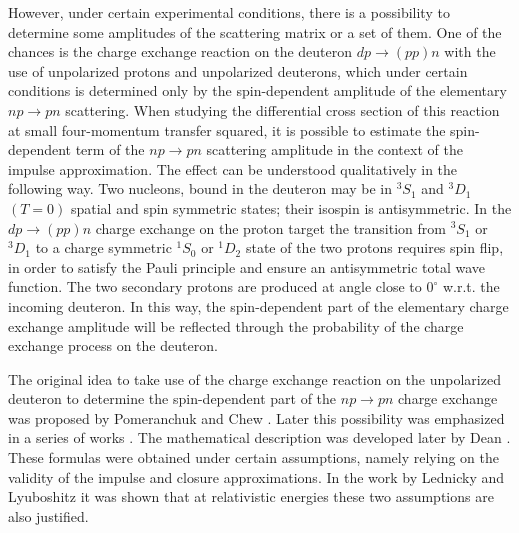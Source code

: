 \documentclass[twocolumn,epjc3]{svjour3}
\newcommand{\np}     {\ensuremath{np \rightarrow pn}\xspace}
\newcommand{\dpchex} {\ensuremath{dp \rightarrow (pp)n}\xspace}
\begin{document}
However, under certain experimental conditions, there is a possibility to
determine some amplitudes of the scattering matrix or a set of them. One of the
chances is the charge exchange reaction on the deuteron \dpchex with the use of
unpolarized protons and unpolarized deuterons, which under certain conditions is
determined only by the spin-dependent amplitude of the elementary \np
scattering. When studying the differential cross section of this reaction at
small four-momentum transfer squared, it is possible to estimate the
spin-dependent term of the \np scattering amplitude in the context of the
impulse approximation. The effect can be understood qualitatively in the
following way. Two nucleons, bound in the deuteron may be in $^3S_1$ and $^3D_1$
$(T = 0)$ spatial and spin symmetric states; their isospin is antisymmetric. In
the \dpchex charge exchange on the proton target the transition from $^3S_1$ or
$^3D_1$ to a charge symmetric $^1S_0$ or $^1D_2$ state of the two protons
requires spin flip, in order to satisfy the Pauli principle and ensure an
antisymmetric total wave function. The two secondary protons are produced at
angle close to $0^\circ$ w.r.t. the incoming deuteron. In this way, the
spin-dependent part of the elementary charge exchange amplitude will be
reflected through the probability of the charge exchange process on the
deuteron.

The original idea to take use of the charge exchange reaction on the unpolarized
deuteron to determine the spin-dependent part of the \np charge exchange was
proposed by Pomeranchuk \cite{pom51} and Chew \cite{chew51}. Later this
possibility was emphasized in a series of works
\cite{mig55,pom51_2,lap57,dea72,dea72_2,ala75,ala75_2,bug87}. The mathematical
description was developed later by Dean \cite{dea72,dea72_2}. These formulas
were obtained under certain assumptions, namely relying on the validity of the
impulse and closure approximations. In the work by Lednicky and Lyuboshitz
\cite{led04} it was shown that at relativistic energies these two assumptions
are also justified.
\end{document}
